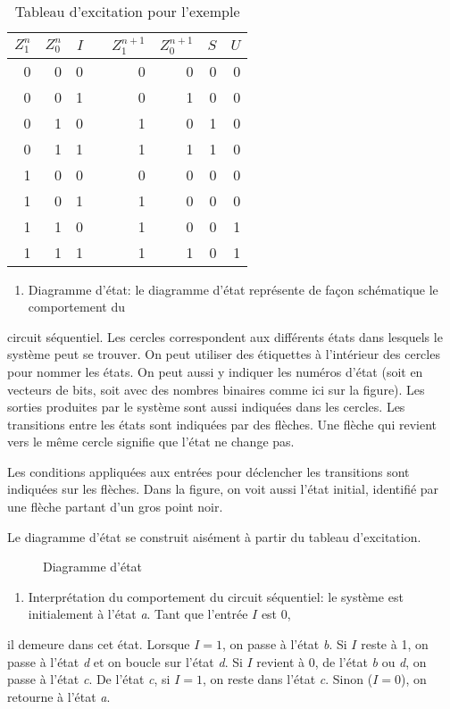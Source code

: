 \documentclass[letter, oneside]{book}
\begin{document}
\begin{table}[htbp]
\caption{\label{tab:orgd917ed1}Tableau d'excitation pour l'exemple}
\centering
\begin{tabular}{rrrlrrrr}
\(Z_1^n\) & \(Z_0^n\) & \(I\) &  & \(Z_1^{n+1}\) & \(Z_0^{n+1}\) & \(S\) & \(U\)\\[0pt]
\hline
0 & 0 & 0 &  & 0 & 0 & 0 & 0\\[0pt]
0 & 0 & 1 &  & 0 & 1 & 0 & 0\\[0pt]
0 & 1 & 0 &  & 1 & 0 & 1 & 0\\[0pt]
0 & 1 & 1 &  & 1 & 1 & 1 & 0\\[0pt]
1 & 0 & 0 &  & 0 & 0 & 0 & 0\\[0pt]
1 & 0 & 1 &  & 1 & 0 & 0 & 0\\[0pt]
1 & 1 & 0 &  & 1 & 0 & 0 & 1\\[0pt]
1 & 1 & 1 &  & 1 & 1 & 0 & 1\\[0pt]
\end{tabular}
\end{table}

\begin{enumerate}
\item Diagramme d'état: le diagramme d'état représente de façon schématique le comportement du
\end{enumerate}
circuit séquentiel. Les cercles correspondent aux différents états
dans lesquels le système peut se trouver. On peut utiliser des
étiquettes à l'intérieur des cercles pour nommer les états. On peut
aussi y indiquer les numéros d'état (soit en vecteurs de bits, soit
avec des nombres binaires comme ici sur la figure). Les sorties
produites par le système sont aussi indiquées dans les cercles.  Les
transitions entre les états sont indiquées par des flèches. Une flèche
qui revient vers le même cercle signifie que l'état ne change pas.

Les conditions appliquées aux entrées pour déclencher les transitions
sont indiquées sur les flèches. Dans la figure, on voit aussi l'état
initial, identifié par une flèche partant d'un gros point noir.

Le diagramme d'état se construit aisément à partir du tableau
d'excitation.

\begin{figure}[htbp]
\centering

\caption{\label{fig:org48e788f}Diagramme d'état}
\end{figure}

\begin{enumerate}
\item Interprétation du comportement du circuit séquentiel: le système est initialement à l'état \emph{a}. Tant que l'entrée \(I\) est 0,
\end{enumerate}
il demeure dans cet état. Lorsque \(I=1\), on passe à l'état \emph{b}. Si
\(I\) reste à 1, on passe à l'état \emph{d} et on boucle sur l'état \emph{d}. Si
\(I\) revient à 0, de l'état \emph{b} ou \emph{d}, on passe à l'état \emph{c}. De l'état \emph{c},
si \(I = 1\), on reste dans l'état \emph{c}. Sinon (\(I = 0\)), on retourne à
l'état \emph{a}.
\end{document}
